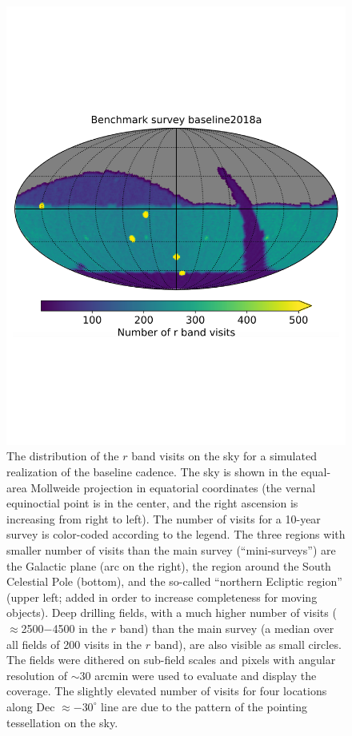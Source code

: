 \begin{figure}
\vskip -0.95in
\includegraphics[width=1.0\hsize,clip]{nvisits_baseline2018a}
\vskip -1.1in
\caption{The distribution of the $r$ band visits on the sky for a simulated
realization of the baseline cadence. The sky is shown in the equal-area Mollweide
projection in equatorial coordinates (the vernal equinoctial point is in the center, and
the right ascension is increasing from right to left). The number of visits for
a 10-year survey is color-coded according
to the legend. The three regions with smaller number of visits than the main survey
(``mini-surveys'') are the Galactic plane (arc on the right), the region around the
South Celestial Pole (bottom), and the so-called ``northern Ecliptic region'' (upper left;
added in order to increase completeness for moving objects). Deep drilling fields, with
a much higher number of visits ($\approx$2500$-$4500 in the $r$ band) than the main survey 
(a median over all fields of 200 visits in the $r$ band), are also visible as small circles.
The fields were dithered on sub-field scales and pixels with angular resolution of
$\sim$30 arcmin were used to evaluate and display the coverage. 
The slightly elevated number of visits for four locations along Dec $\approx -30^\circ$ line 
are due to the pattern of the pointing tessellation on the sky.}
\label{Fig:rbandSky}
\end{figure}

